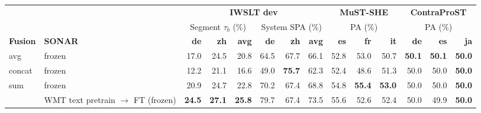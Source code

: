 \begin{table}[t]
\centering
\footnotesize
\setlength{\tabcolsep}{3pt}
\begin{tabular}{ll|rrr|rrr|rrr|rrr}
\toprule
 & & \multicolumn{6}{c|}{\textbf{IWSLT dev}} & \multicolumn{3}{c|}{\textbf{MuST-SHE}} & \multicolumn{3}{c}{\textbf{ContraProST}} \\
 & & \multicolumn{3}{c|}{Segment $\tau_b$ (\%)} & \multicolumn{3}{c|}{System SPA (\%)} & \multicolumn{3}{c|}{PA (\%)} & \multicolumn{3}{c}{PA (\%)} \\
\cmidrule(lr){3-5}\cmidrule(lr){6-8}\cmidrule(lr){9-11}\cmidrule(lr){12-14}
\textbf{Fusion} & \textbf{SONAR} & \textbf{de} & \textbf{zh} & \textbf{avg} & \textbf{de} & \textbf{zh} & \textbf{avg} & \textbf{es} & \textbf{fr} & \textbf{it} & \textbf{de} & \textbf{es} & \textbf{ja} \\
\midrule
avg & frozen & \cellcolor[RGB]{227,243,242}17.0 & \cellcolor[RGB]{214,237,237}24.5 & \cellcolor[RGB]{222,241,240}20.8 & \cellcolor[RGB]{219,239,239}64.5 & \cellcolor[RGB]{252,253,253}67.7 & \cellcolor[RGB]{231,244,244}66.1 & \cellcolor[RGB]{252,221,197}52.8 & \cellcolor[RGB]{252,215,186}53.0 & \cellcolor[RGB]{253,238,226}50.7 & \cellcolor[RGB]{232,168,205}\textbf{50.1} & \cellcolor[RGB]{232,168,205}\textbf{50.1} & \cellcolor[RGB]{255,255,255}\textbf{50.0} \\
\cmidrule(l){1-14}
concat & frozen & \cellcolor[RGB]{255,255,255}12.2 & \cellcolor[RGB]{255,255,255}21.1 & \cellcolor[RGB]{255,255,255}16.6 & \cellcolor[RGB]{255,255,255}49.0 & \cellcolor[RGB]{183,224,223}\textbf{75.7} & \cellcolor[RGB]{255,255,255}62.3 & \cellcolor[RGB]{253,226,205}52.4 & \cellcolor[RGB]{255,255,255}48.6 & \cellcolor[RGB]{252,224,201}51.3 & \cellcolor[RGB]{255,255,255}50.0 & \cellcolor[RGB]{255,255,255}50.0 & \cellcolor[RGB]{255,255,255}\textbf{50.0} \\
\cmidrule(l){1-14}
\multirow{3}{*}{sum} & frozen & \cellcolor[RGB]{204,233,233}20.9 & \cellcolor[RGB]{212,236,236}24.7 & \cellcolor[RGB]{207,234,234}22.8 & \cellcolor[RGB]{206,234,233}70.2 & \cellcolor[RGB]{255,255,255}67.4 & \cellcolor[RGB]{214,237,237}68.8 & \cellcolor[RGB]{251,197,156}54.8 & \cellcolor[RGB]{250,183,132}\textbf{55.4} & \cellcolor[RGB]{250,183,132}\textbf{53.0} & \cellcolor[RGB]{255,255,255}50.0 & \cellcolor[RGB]{255,255,255}50.0 & \cellcolor[RGB]{255,255,255}\textbf{50.0} \\
 & \quad WMT text pretrain $\to$ FT (frozen) & \cellcolor[RGB]{183,224,223}\textbf{24.5} & \cellcolor[RGB]{183,224,223}\textbf{27.1} & \cellcolor[RGB]{183,224,223}\textbf{25.8} & \cellcolor[RGB]{184,224,224}79.7 & \cellcolor[RGB]{255,255,255}67.4 & \cellcolor[RGB]{185,225,224}73.5 & \cellcolor[RGB]{250,188,140}55.6 & \cellcolor[RGB]{252,220,195}52.6 & \cellcolor[RGB]{251,197,156}52.4 & \cellcolor[RGB]{255,255,255}50.0 & \cellcolor[RGB]{255,255,255}49.9 & \cellcolor[RGB]{255,255,255}\textbf{50.0} \\

\end{tabular}
\end{table}
